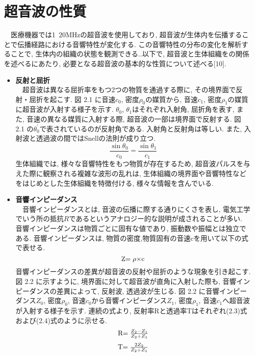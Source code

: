 \section{超音波の性質}
　医療機器では1~20MHzの超音波を使用しており, 超音波が生体内を伝播することで伝播経路における音響特性が変化する. この音響特性の分布の変化を解析することで, 生体内の組織の状態を観測できる..以下で, 超音波と生体組織をの関係を述べるにあたり, 必要となる超音波の基本的な性質について述べる[10].
\begin{itemize}
\item{\bf 反射と屈折}
\\\ \ 超音波は異なる屈折率をもつ2つの物質を通過する際に, その境界面で反射・屈折を起こす. 図 2.1 に音速$c_0$, 密度$\rho_0$の媒質から, 音速$c_1$, 密度$\rho_1$の媒質に超音波が入射する様子を示す. $\theta_0$, $\theta_1$はそれぞれ入射角, 屈折角を表す, また, 音速の異なる媒質に入射する際, 超音波の一部は境界面で反射する. 図 2.1 の$\theta_0^{\prime}$で表されているのが反射角である. 入射角と反射角は等しい. また, 入射波と透過波の間ではSnellの法則が成り立つ.
\begin{equation}
 \frac{\sin\theta_0}{c_0} = \frac{\sin\theta_1}{c_1}
\end{equation}
生体組織では, 様々な音響特性をもつ物質が存在するため, 超音波パルスを与えた際に観察される複雑な波形の乱れは, 生体組織の境界面や音響特性などをはじめとした生体組織を特徴付ける, 様々な情報を含んでいる. 
\item{\bf 音響インピーダンス}
\\\ \ 音響インピーダンスとは, 音波の伝播に際する通りにくさを表し, 電気工学でいう所の抵抗$R$であるというアナロジー的な説明が成されることが多い. 音響インピーダンスは物質ごとに固有な値であり, 振動数や振幅とは独立である. 音響インピーダンスは, 物質の密度,物質固有の音速cを用いて以下の式で表せる.
\begin{equation}
 $Z$ = \rho \times $c$
\end{equation}
音響インピーダンスの差異が超音波の反射や屈折のような現象を引き起こす. 図 2.2 に示すように, 境界面に対して超音波が直角に入射した際も, 音響インピーダンスの差異によって, 反射波, 透過波が生じる. 図 2.2 に音響インピーダンス$Z_0$, 密度$\rho_0$, 音速$c_0$から音響インピーダンス$Z_1$, 密度$\rho_1$, 音速$c_1$へ超音波が入射する様子を示す. 連続の式より, 反射率Rと透過率Tはそれぞれ(2.3)式および(2.4)式のように示せる.
\begin{equation}
$R$= \frac{Z_2 - Z_1}{Z_2 + Z_1}
\end{equation}
\begin{equation}
$T$= \frac{2Z_2}{Z_2 + Z_1}

\end{equation}
\end{itemize}
